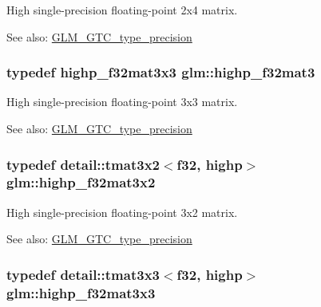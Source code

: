 High single-precision floating-point 2x4 matrix. \begin{Desc}
\item[See also:]\hyperlink{group__gtc__type__precision}{GLM\_\-GTC\_\-type\_\-precision} \end{Desc}
\hypertarget{group__gtc__type__precision_g06809818db73785334f839742a9ad85a}{
\subsubsection[highp\_\-f32mat3]{\setlength{\rightskip}{0pt plus 5cm}typedef highp\_\-f32mat3x3 {\bf glm::highp\_\-f32mat3}}}
\label{group__gtc__type__precision_g06809818db73785334f839742a9ad85a}


High single-precision floating-point 3x3 matrix. \begin{Desc}
\item[See also:]\hyperlink{group__gtc__type__precision}{GLM\_\-GTC\_\-type\_\-precision} \end{Desc}
\hypertarget{group__gtc__type__precision_gf36b2b34ea881977c61491b0d3b25a28}{
\subsubsection[highp\_\-f32mat3x2]{\setlength{\rightskip}{0pt plus 5cm}typedef detail::tmat3x2$<$f32, highp$>$ {\bf glm::highp\_\-f32mat3x2}}}
\label{group__gtc__type__precision_gf36b2b34ea881977c61491b0d3b25a28}


High single-precision floating-point 3x2 matrix. \begin{Desc}
\item[See also:]\hyperlink{group__gtc__type__precision}{GLM\_\-GTC\_\-type\_\-precision} \end{Desc}
\hypertarget{group__gtc__type__precision_g334eca23d23aef90972fb20c5b749ca3}{
\subsubsection[highp\_\-f32mat3x3]{\setlength{\rightskip}{0pt plus 5cm}typedef detail::tmat3x3$<$f32, highp$>$ {\bf glm::highp\_\-f32mat3x3}}}
\label{group__gtc__type__precision_g334eca23d23aef90972fb20c5b749ca3}


